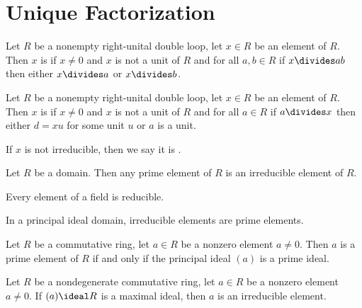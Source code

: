 \section{Unique Factorization}

\begin{definition}
Let $R$ be a nonempty right-unital double loop, let $x\in R$ be an
element of $R$. Then $x$ is  if $x\neq0$ and $x$ is not
a unit of $R$ and for all $a,b\in R$ if $x\divides ab$ then either
$x\divides a$ or $x\divides b$.
\end{definition}

\begin{definition}
Let $R$ be a nonempty right-unital double loop, let $x\in R$ be an
element of $R$. Then $x$ is  if $x\neq0$ and $x$ is not
a unit of $R$ and for all $a\in R$ if $a\divides x$ then either
$d=xu$ for some unit $u$ or $a$ is a unit.

If $x$ is not irreducible, then we say it is .
\end{definition}

\begin{theorem}
Let $R$ be a domain. Then any prime element of $R$ is an irreducible
element of $R$.
\end{theorem}

\begin{proposition}
Every element of a field is reducible.
\end{proposition}

\begin{proposition}
In a principal ideal domain, irreducible elements are prime elements.
\end{proposition}

\begin{theorem}
Let $R$ be a commutative ring, let $a\in R$ be a nonzero element $a\neq0$.
Then $a$ is a prime element of $R$ if and only if the principal ideal
$(a)$ is a prime ideal.
\end{theorem}

\begin{theorem}
Let $R$ be a nondegenerate commutative ring, let $a\in R$ be a nonzero
element $a\neq0$. If $(a)\ideal R$ is a maximal ideal, then $a$ is an
irreducible element.
\end{theorem}

